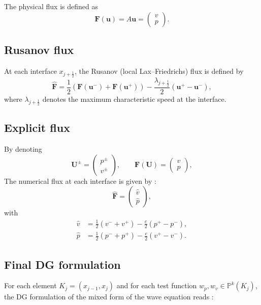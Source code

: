 \documentclass[11pt,a4paper]{report}
\theoremstyle{plain}
\theoremstyle{definition}
\begin{document}
The physical flux is defined as
\begin{equation}
\mathbf{F}(\mathbf{u}) = A \mathbf{u}
=
\begin{pmatrix}
v \\
p
\end{pmatrix}.
\end{equation}

\subsection{Rusanov flux}

At each interface $x_{j+\frac12}$, the Rusanov (local Lax--Friedrichs) flux is defined by
\begin{equation}
\widehat{\mathbf{F}} =
\frac{1}{2}
\left(
\mathbf{F}(\mathbf{u}^-) + \mathbf{F}(\mathbf{u}^+)
\right)
-
\frac{\lambda_{j+\frac12}}{2}
\left(
\mathbf{u}^+ - \mathbf{u}^-
\right),
\label{eq:rusanov}
\end{equation}
where $\lambda_{j+\frac12}$ denotes the maximum characteristic speed at the interface.


\subsection{Explicit flux}
By denoting
$$
\mathbf U^\pm =
\begin{pmatrix}
p^\pm\\
v^\pm
\end{pmatrix},
\qquad
\mathbf F(\mathbf U)=
\begin{pmatrix}
v\\
p
\end{pmatrix},
$$
The numerical flux at each interface is given by :
$$
\widehat{\mathbf F} =
\begin{pmatrix}
\widehat{v}\\
\widehat{p}
\end{pmatrix},
$$
with
$$
\boxed{
\begin{aligned}
\widehat{v}
& =
\frac12\left(v^-+v^+\right)
-
\frac{c}{2}\left(p^+-p^-\right),
\\
\widehat{p}
& =
\frac12\left(p^-+p^+\right)
-
\frac{c}{2}\left(v^+-v^-\right).
\end{aligned}
}
$$

\subsection{Final DG formulation}
For each element $K_j=(x_{j-1},x_j)$ and 
for each test function $w_p,w_v\in\mathbb P^k(K_j)$, 
the DG formulation of the mixed form of the wave equation reads :
\end{document}
